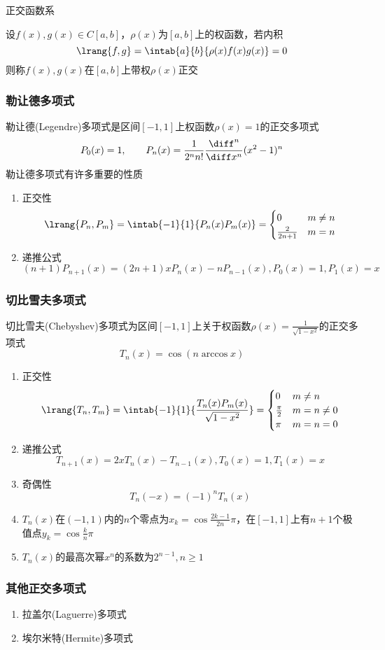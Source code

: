 正交函数系
\begin{definition}[正交]
    设$f(x),g(x)\in C[a,b]$，$\rho(x)$为$[a,b]$上的权函数，若内积
    \[\lrang{f,g}=\intab{a}{b}{\rho(x)f(x)g(x)}=0\]
    则称$f(x),g(x)$在$[a,b]$上带权$\rho(x)$正交
\end{definition}

\subsubsection{勒让德多项式}
勒让德(Legendre)多项式是区间$[-1,1]$上权函数$\rho(x)=1$的正交多项式
\[P_0(x)=1,\qquad P_n(x)=\frac{1}{2^nn!}\frac{\diff^n}{\diff x^n}(x^2-1)^n\]
勒让德多项式有许多重要的性质
\begin{enumerate}
    \item 正交性
\[\lrang{P_n,P_m}=\intab{-1}{1}{P_n(x)P_m(x)}=\begin{cases}0&m\ne n\\\frac{2}{2n+1}&m=n\end{cases}\]
    \item 递推公式
    \[(n+1)P_{n+1}(x)=(2n+1)xP_n(x)-nP_{n-1}(x),P_0(x)=1,P_1(x)=x\]
\end{enumerate}

\subsubsection{切比雪夫多项式}
切比雪夫(Chebyshev)多项式为区间$[-1,1]$上关于权函数$\rho(x)=\frac{1}{\sqrt{1-x^2}}$的正交多项式
\[T_n(x)=\cos(n\arccos x)\]
\begin{enumerate}
    \item 正交性
\[\lrang{T_n,T_m}=\intab{-1}{1}{\frac{T_n(x)P_m(x)}{\sqrt{1-x^2}}}=\begin{cases}0&m\ne n\\\frac{\pi}{2}&m=n\ne 0\\\pi&m=n=0\end{cases}\]
    \item 递推公式
\[T_{n+1}(x)=2xT_n(x)-T_{n-1}(x),T_0(x)=1,T_1(x)=x\]
    \item 奇偶性
\[T_n(-x)=(-1)^nT_n(x)\]
    \item $T_n(x)$在$(-1,1)$内的$n$个零点为$x_k=\cos\frac{2k-1}{2n}\pi$，在$[-1,1]$上有$n+1$个极值点$y_k=\cos\frac{k}{n}\pi$
    \item $T_n(x)$的最高次幂$x^n$的系数为$2^{n-1},n\geq 1$
\end{enumerate}

\subsubsection{其他正交多项式}
\begin{enumerate}
    \item 拉盖尔(Laguerre)多项式
    \item 埃尔米特(Hermite)多项式
\end{enumerate}

